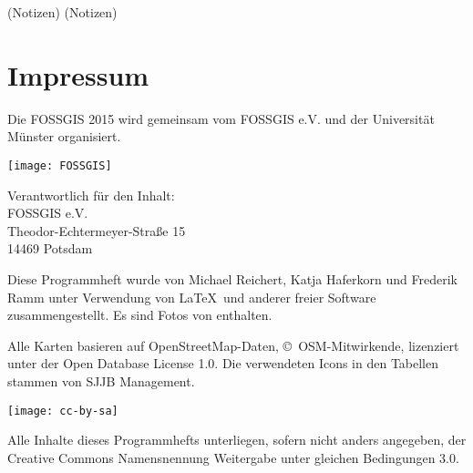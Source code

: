 \newpage
(Notizen)
\newpage
(Notizen)

\newpage
\section*{Impressum}
\label{impressum}
\vspace{-0.5em}


\begin{raggedright}
Die FOSSGIS 2015 wird gemeinsam vom FOSSGIS e.V. und der Universität Münster 
organisiert.

\vspace{0.5em}
	\texttt{[image: FOSSGIS]}

\vspace{0.5em}
\noindent Verantwortlich für den Inhalt:\\
FOSSGIS e.V.\\
Theodor-Echtermeyer-Straße 15\\
14469 Potsdam

\vspace{1em}
\noindent Diese Programmheft wurde von Michael Reichert, Katja Haferkorn und 
Frederik Ramm unter Verwendung von \LaTeX\ und anderer freier Software zusammengestellt. Es sind Fotos von %
enthalten.

\vspace{0.5em}

\noindent Alle Karten basieren auf Open\-Street\-Map-Daten, 
\mbox{\copyright\ OSM}-Mitwirkende, lizenziert unter der Open Database License 1.0.
Die verwendeten Icons in den Tabellen stammen von SJJB Management.


\vspace{1em}
\noindent \begin{minipage}[htbp]{0.2\textwidth}
\noindent\texttt{[image: cc-by-sa]}
\end{minipage}
\hfill
\begin{minipage}[hbtp]{0.74\textwidth}
Alle Inhalte dieses Programmhefts unterliegen, sofern nicht anders angegeben, 
der Creative Commons Namensnennung Weitergabe unter gleichen Bedingungen 3.0.
\end{minipage}
\end{raggedright}

